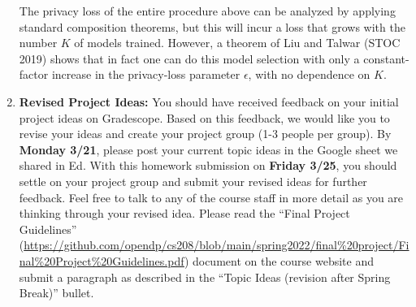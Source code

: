 \documentclass[11pt]{article}
\theoremstyle{plain}
\theoremstyle{definition}
\theoremstyle{solution}
\begin{document}
\begin{enumerate}
    The privacy loss of the entire procedure above can be analyzed by applying standard composition theorems, but this will incur a loss that grows with the number $K$ of models trained. However, a theorem of Liu and Talwar (STOC 2019) shows that in fact one can do this model selection with only a constant-factor increase in the privacy-loss parameter $\epsilon$, with no dependence on  $K$.
\iffalse    
    To analyze the privacy of this DP parameter selection process, it is straightforward to consider the composition over $K$ runs of the DP models and the exponential mechanism. This approach will give us $O(\epsilon K)$-DP which allows for privacy budget of only $\epsilon/K$ for each DP model (or $\epsilon\sqrt{\ln \frac{1}{\delta}}/\sqrt{K}$ if using advanced composition). In fact, since we are only going to release one model, this approach will waste privacy-loss budget. Theorem 1.3 in [Li and Talware 18] \footnote{https://arxiv.org/pdf/1811.07971.pdf} addresses this issue and shows that overall privacy loss can be bounded by $O(\epsilon)$.
\fi    
    
    \item \textbf{Revised Project Ideas:}
    You should have received feedback on your initial project ideas on Gradescope. Based on this feedback, we would like you to revise your ideas and create your project group (1-3 people per group).
    By \textbf{Monday 3/21}, please post your current topic ideas in the Google sheet we shared in Ed.
    With this homework submission on \textbf{Friday 3/25}, you should settle on your project group and submit your revised ideas for further feedback.
    Feel free to talk to any of the course staff in more detail as you are thinking through your revised idea. Please read the
    ``Final Project Guidelines'' (\url{https://github.com/opendp/cs208/blob/main/spring2022/final%20project/Final%20Project%20Guidelines.pdf}) 
    document on the course website and
    submit a paragraph as described in the ``Topic Ideas (revision after Spring Break)'' bullet.
\end{enumerate}
\end{document}
